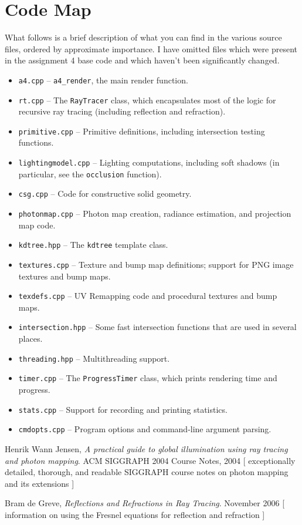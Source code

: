 \documentclass{article}
\begin{document}
\section{Code Map}

What follows is a brief description of what you can find in the various source
files, ordered by approximate importance. I have omitted files which were
present in the assignment 4 base code and which haven't been significantly
changed.

\newcommand{\cmditem}[1]{\item {\tt #1}}

\begin{itemize}
    \cmditem{a4.cpp} -- {\tt a4\_render}, the main render function.
    \cmditem{rt.cpp} -- The {\tt RayTracer} class, which encapsulates most of
    the logic for recursive ray tracing (including reflection and refraction).
    \cmditem{primitive.cpp} -- Primitive definitions, including intersection
    testing functions.
    \cmditem{lightingmodel.cpp} -- Lighting computations, including soft shadows
    (in particular, see the {\tt occlusion} function).
    \cmditem{csg.cpp} -- Code for constructive solid geometry.
    \cmditem{photonmap.cpp} -- Photon map creation, radiance estimation, and
    projection map code.
    \cmditem{kdtree.hpp} -- The {\tt kdtree} template class.
    \cmditem{textures.cpp} -- Texture and bump map definitions; support for
    PNG image textures and bump maps.
    \cmditem{texdefs.cpp} -- UV Remapping code and procedural textures and bump
    maps.
    \cmditem{intersection.hpp} -- Some fast intersection functions that are used
    in several places.
    \cmditem{threading.hpp} -- Multithreading support.
    \cmditem{timer.cpp} -- The {\tt ProgressTimer} class, which prints rendering
    time and progress.
    \cmditem{stats.cpp} -- Support for recording and printing statistics.
    \cmditem{cmdopts.cpp} -- Program options and command-line argument parsing.
\end{itemize}

\begin{thebibliography}{9}

 Henrik Wann Jensen,
 \emph{A practical guide to global illumination using ray tracing and photon mapping}.
 ACM SIGGRAPH 2004 Course Notes, 2004 [ exceptionally detailed, thorough, and readable SIGGRAPH course notes on photon mapping and its extensions ]

Bram de Greve, \emph{Reflections and Refractions in Ray Tracing}. November 2006
[ information on using the Fresnel equations for reflection and refraction ]

\end{thebibliography}
\end{document}
